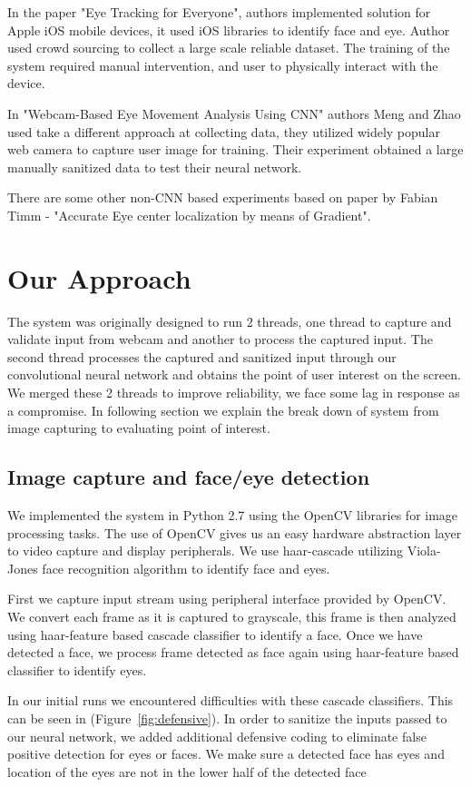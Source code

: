 \documentclass[10pt,twocolumn,letterpaper]{article}
\begin{document}
In the paper "Eye Tracking for Everyone", authors implemented solution for Apple iOS mobile devices, it used iOS libraries to identify face and eye. Author used crowd sourcing to collect a large scale reliable dataset. The training of the system required manual intervention, and user to physically interact with the device. 

In "Webcam-Based Eye Movement Analysis Using CNN" authors Meng and Zhao used take a different approach at collecting data, they utilized widely popular web camera to capture user image for training. Their experiment obtained a large manually sanitized data to test their neural network. 

There are some other non-CNN based experiments based on paper by Fabian Timm - "Accurate Eye center localization by means of Gradient". 

\section{Our Approach}
The system was originally  designed to run 2 threads, one thread to capture 
and validate input from webcam and another to process the 
captured input. The second thread processes the captured and 
sanitized input through our convolutional neural network and 
obtains the point of user interest on the screen. We merged these 2 threads to improve reliability, we face some lag in response as a compromise. In following section we explain the break down of system from image capturing  to evaluating point of interest.  

\subsection{Image capture and face/eye detection}
We implemented the system in Python 2.7 using the OpenCV libraries for 
image processing tasks. The use of OpenCV gives us an easy hardware 
abstraction layer to video capture and display peripherals. We use 
haar-cascade utilizing Viola-Jones face recognition algorithm to 
identify face and eyes. 

First we capture input stream using peripheral
interface provided by OpenCV. We convert each 
frame as it is captured to grayscale, this frame is then analyzed 
using haar-feature based cascade classifier to identify a face. 
Once we have detected a face, we process frame detected 
as face again using haar-feature based classifier to identify eyes. 

In our initial runs we encountered difficulties with these cascade classifiers.
This can be seen in  (Figure~\ref{fig:defensive}).
In order to sanitize the inputs passed to our neural network, we added 
additional defensive coding to eliminate false positive detection 
for eyes or faces. We make sure a detected face has eyes 
and location of the eyes are not in the lower half of the detected face
\end{document}
